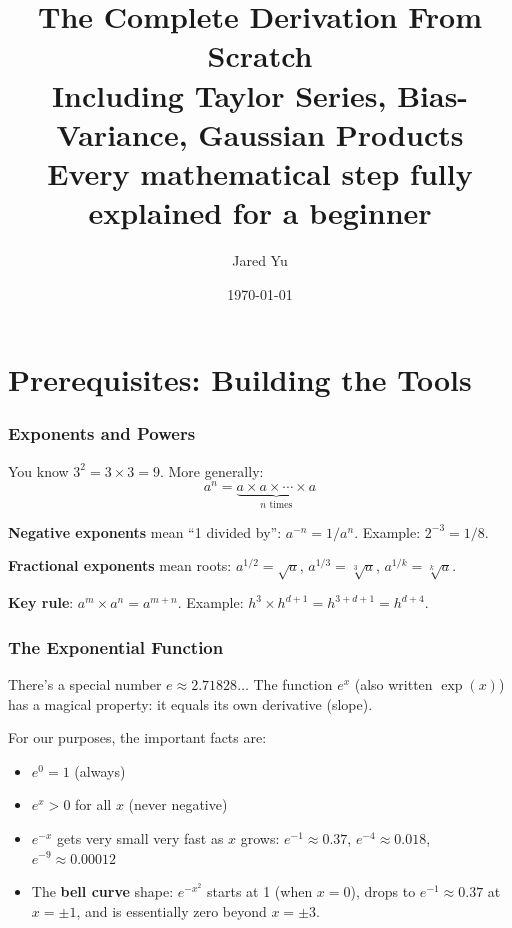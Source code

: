 \documentclass[12pt]{article}
\title{The Complete Derivation From Scratch\\[0.3em]\large Including Taylor Series, Bias-Variance, Gaussian Products\\[0.3em]\normalsize Every mathematical step fully explained for a beginner}
\author{Jared Yu}
\date{\today}
\begin{document}
\maketitle
\tableofcontents
\newpage

\part{Prerequisites: Building the Tools}

\section{Exponents and Powers}

You know $3^2 = 3 \times 3 = 9$. More generally:
$$a^n = \underbrace{a \times a \times \cdots \times a}_{n \text{ times}}$$

\textbf{Negative exponents} mean ``1 divided by'': $a^{-n} = 1/a^n$. Example: $2^{-3} = 1/8$.

\textbf{Fractional exponents} mean roots: $a^{1/2} = \sqrt{a}$, $a^{1/3} = \sqrt[3]{a}$, $a^{1/k} = \sqrt[k]{a}$.

\textbf{Key rule}: $a^m \times a^n = a^{m+n}$. Example: $h^3 \times h^{d+1} = h^{3+d+1} = h^{d+4}$.

\section{The Exponential Function}

There's a special number $e \approx 2.71828\ldots$ The function $e^x$ (also written $\exp(x)$) has a magical property: it equals its own derivative (slope).

For our purposes, the important facts are:
\begin{itemize}
\item $e^0 = 1$ (always)
\item $e^x > 0$ for all $x$ (never negative)
\item $e^{-x}$ gets very small very fast as $x$ grows: $e^{-1} \approx 0.37$, $e^{-4} \approx 0.018$, $e^{-9} \approx 0.00012$
\item The \textbf{bell curve} shape: $e^{-x^2}$ starts at 1 (when $x=0$), drops to $e^{-1} \approx 0.37$ at $x = \pm 1$, and is essentially zero beyond $x = \pm 3$.
\end{itemize}
\end{document}
